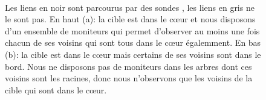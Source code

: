 \begin{figure}[!ht] \centering
{}
\\
\caption[Mesure de la liste des interfaces avec \traceroute]{Les liens en noir
sont parcourus par des sondes \traceroute, les liens en gris ne le sont pas. En haut (a):
la cible est dans le cœur et nous disposons d'un ensemble de moniteurs qui
permet d'observer au moins une fois chacun de ses voisins qui sont tous dans le
cœur égalemment. En bas (b): la cible est dans le cœur mais certains de ses
voisins sont dans le bord. Nous ne disposons pas de moniteurs dans les arbres
dont ces voisins sont les racines, donc nous n'observons que les voisins de la
cible qui sont dans le cœur.}
\label{fig:traceroute-many-to-one}
\end{figure}

